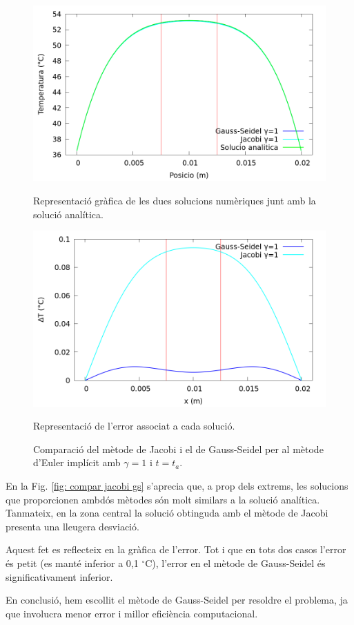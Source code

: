 \documentclass[11pt]{article}
\begin{document}
\begin{figure}[H]
    \centering
    \begin{minipage}{0.45\textwidth}
        \centering
        \includegraphics[width=\linewidth]{Implicit_N/implicit_grafica_comparacio.png}
        \caption{Representació gràfica de les dues solucions numèriques junt amb la solució analítica.}
        \label{fig: compar jacobi gs}
    \end{minipage}\hfill
    \begin{minipage}{0.45\textwidth}
        \centering
        \includegraphics[width=\linewidth]{Implicit_N/error_implicit_comparacio.png}
        \caption{Representació de l'error associat a cada solució.}
        \label{fig: error compar jacobi gs}
    \end{minipage}
    \caption{Comparació del mètode de Jacobi i el de Gauss-Seidel per al mètode d'Euler implícit amb $\gamma=1$ i $t=t_a$.}
    \label{fig: comparacio jacobi i gs}
\end{figure}

En la Fig. \ref{fig: compar jacobi gs} s'aprecia que, a prop dels extrems, les solucions que proporcionen ambdós mètodes són molt similars a la solució analítica. Tanmateix, en la zona central la solució obtinguda amb el mètode de Jacobi presenta una lleugera desviació.

Aquest fet es reflecteix en la gràfica de l’error. Tot i que en tots dos casos l’error és petit (es manté inferior a 0,1 $^\circ$C), l'error en el mètode de Gauss-Seidel és significativament inferior.

En conclusió, hem escollit el mètode de Gauss-Seidel per resoldre el problema, ja que involucra menor error i millor eficiència computacional.
\end{document}
